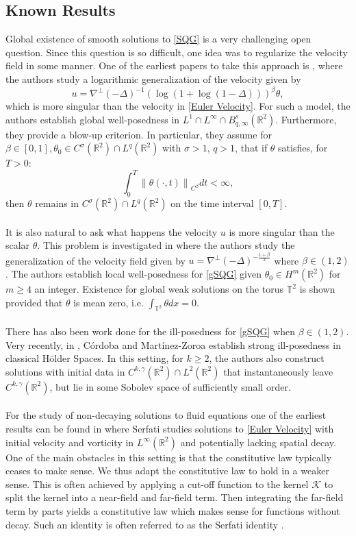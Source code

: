 \documentclass[12pt,xcolor=svgnames]{amsart}
\newcommand{\R}{\mathbb{R}}
\newcommand{\norm}[2]{\left\lVert#1\right\rVert_{#2}}
\begin{document}
\subsection{Known Results}
Global existence of smooth solutions to \eqref{SQG} is a very challenging open question.  Since this question is so difficult, one idea was to regularize the velocity field in some manner. One of the earliest papers to take this approach is \cite{10}, where the authors study a logarithmic generalization of the velocity given by $$u = \nabla^{\perp}(-\Delta)^{-1}(\log(1+\log(1-\Delta)))^{\beta}\theta,$$ which is more singular than the velocity in \eqref{Euler Velocity}. For such a model, the authors establish global well-posedness in $L^1 \cap L^{\infty} \cap B_{q,\infty}^s(\R^2) $. Furthermore, they provide a blow-up criterion. In particular, they assume for $\beta \in [0,1],\theta_0 \in C^{\sigma}(\R^2) \cap L^q(\R^2)$ with $\sigma>1$, $q>1$, that if $\theta$ satisfies, for $T>0$:
$$
\int_0^T \norm{\theta(\cdot,t)}{C^{\beta}}dt < \infty,
$$
then $\theta$ remains in $C^{\sigma}(\R^2) \cap L^q(\R^2)$ on the time interval $[0,T]$.
\\
\\
 It is also natural to ask what happens the velocity $u$ is more singular than the scalar $\theta$. This problem is investigated in \cite{10} where the authors study the generalization of the velocity field given by $u=\nabla^{\perp}(-\Delta)^{-\frac{1+\beta}{2}}$ where $\beta \in (1,2)$. The authors establish local well-posedness for \eqref{gSQG} given $\theta_0 \in H^m(\R^2)$ for $m \geq 4$ an integer. Existence for global weak solutions on the torus $\mathbb{T}^2$ is shown provided that $\theta$ is mean zero, i.e. $\int_{\mathbb{T}^2}\theta dx =0$.
\\
\\
There has also been  work done for the ill-posedness for \eqref{gSQG} when $\beta \in (1,2)$. Very recently, in \cite{9}, Córdoba and Martínez-Zoroa establish strong ill-posedness in classical Hölder Spaces. In this setting, for $k \geq 2$, the authors also construct solutions with initial data in $C^{k,\gamma}(\R^2)\cap L^2(\R^2)$ that instantaneously leave $C^{k,\gamma}(\R^2)$, but lie in some Sobolev space of sufficiently small order. 
\\
\\
For the study of non-decaying solutions to fluid equations one of the earliest results can be found in \cite{7} where Serfati studies solutions to \eqref{Euler Velocity} with initial velocity and vorticity in $L^{\infty}(\R^2)$ and potentially lacking spatial decay. One of the main obstacles in this setting is that the constitutive law typically ceases to make sense. We thus adapt the constitutive law to hold in a weaker sense. This is often achieved by applying a cut-off function to the kernel $\mathcal{K}$ to split the kernel into a near-field and far-field term. Then integrating the far-field term by parts yields a constitutive law which makes sense for functions without decay. Such an identity is often referred to as the Serfati identity \cite{7}.
\end{document}
